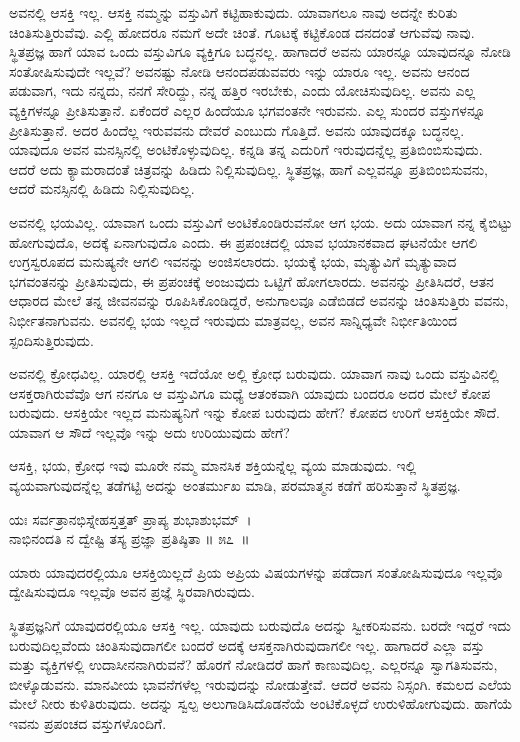 ಅವನಲ್ಲಿ ಆಸಕ್ತಿ ಇಲ್ಲ. ಆಸಕ್ತಿ ನಮ್ಮನ್ನು ವಸ್ತುವಿಗೆ ಕಟ್ಟಿಹಾಕುವುದು. ಯಾವಾಗಲೂ ನಾವು ಅದನ್ನೇ ಕುರಿತು ಚಿಂತಿಸುತ್ತಿರುವೆವು. ಎಲ್ಲಿ ಹೋದರೂ ನಮಗೆ ಅದೇ ಚಿಂತೆ. ಗೂಟಕ್ಕೆ ಕಟ್ಟಿಕೊಂಡ ದನದಂತೆ ಆಗುವೆವು ನಾವು. ಸ್ಥಿತಪ್ರಜ್ಞ ಹಾಗೆ ಯಾವ ಒಂದು ವಸ್ತುವಿಗೂ ವ್ಯಕ್ತಿಗೂ ಬದ್ಧನಲ್ಲ. ಹಾಗಾದರೆ ಅವನು ಯಾರನ್ನೂ ಯಾವುದನ್ನೂ ನೋಡಿ ಸಂತೋಷಿಸುವುದೇ ಇಲ್ಲವೆ? ಅವನಷ್ಟು ನೋಡಿ ಆನಂದಪಡುವವರು ಇನ್ನು ಯಾರೂ ಇಲ್ಲ. ಅವನು ಆನಂದ ಪಡುವಾಗ, ಇದು ನನ್ನದು, ನನಗೆ ಸೇರಿದ್ದು, ನನ್ನ ಹತ್ತಿರ ಇರಬೇಕು, ಎಂದು ಯೋಚಿಸುವುದಿಲ್ಲ. ಅವನು ಎಲ್ಲ ವ್ಯಕ್ತಿಗಳನ್ನೂ ಪ್ರೀತಿಸುತ್ತಾನೆ. ಏಕೆಂದರೆ ಎಲ್ಲರ ಹಿಂದೆಯೂ ಭಗವಂತನೇ ಇರುವನು. ಎಲ್ಲ ಸುಂದರ ವಸ್ತುಗಳನ್ನೂ ಪ್ರೀತಿಸುತ್ತಾನೆ. ಅದರ ಹಿಂದೆಲ್ಲ ಇರುವವನು ದೇವರೆ ಎಂಬುದು ಗೊತ್ತಿದೆ. ಅವನು ಯಾವುದಕ್ಕೂ ಬದ್ಧನಲ್ಲ. ಯಾವುದೂ ಅವನ ಮನಸ್ಸಿನಲ್ಲಿ ಅಂಟಿಕೊಳ್ಳುವುದಿಲ್ಲ. ಕನ್ನಡಿ ತನ್ನ ಎದುರಿಗೆ ಇರುವುದನ್ನೆಲ್ಲ ಪ್ರತಿಬಿಂಬಿಸುವುದು. ಆದರೆ ಅದು ಕ್ಯಾಮರಾದಂತೆ ಚಿತ್ರವನ್ನು ಹಿಡಿದು ನಿಲ್ಲಿಸುವುದಿಲ್ಲ. ಸ್ಥಿತಪ್ರಜ್ಞ, ಹಾಗೆ ಎಲ್ಲವನ್ನೂ ಪ್ರತಿಬಿಂಬಿಸುವನು, ಆದರೆ ಮನಸ್ಸಿನಲ್ಲಿ ಹಿಡಿದು ನಿಲ್ಲಿಸುವುದಿಲ್ಲ.

ಅವನಲ್ಲಿ ಭಯವಿಲ್ಲ. ಯಾವಾಗ ಒಂದು ವಸ್ತುವಿಗೆ ಅಂಟಿಕೊಂಡಿರುವನೋ ಆಗ ಭಯ. ಅದು ಯಾವಾಗ ನನ್ನ ಕೈಬಿಟ್ಟು ಹೋಗುವುದೊ, ಅದಕ್ಕೆ ಏನಾಗುವುದೊ ಎಂದು. ಈ ಪ್ರಪಂಚದಲ್ಲಿ ಯಾವ ಭಯಾನಕವಾದ ಘಟನೆಯೇ ಆಗಲಿ ಉಗ್ರಸ್ವರೂಪದ ಮನುಷ್ಯನೇ ಆಗಲಿ ಇವನನ್ನು ಅಂಜಿಸಲಾರದು. ಭಯಕ್ಕೆ ಭಯ, ಮೃತ್ಯುವಿಗೆ ಮೃತ್ಯುವಾದ ಭಗವಂತನನ್ನು ಪ್ರೀತಿಸುವುದು, ಈ ಪ್ರಪಂಚಕ್ಕೆ ಅಂಜುವುದು ಒಟ್ಟಿಗೆ ಹೋಗಲಾರದು. ಅವನನ್ನು ಪ್ರೀತಿಸಿದರೆ, ಆತನ ಆಧಾರದ ಮೇಲೆ ತನ್ನ ಜೀವನವನ್ನು ರೂಪಿಸಿಕೊಂಡಿದ್ದರೆ, ಅನುಗಾಲವೂ ಎಡೆಬಿಡದೆ ಅವನನ್ನು ಚಿಂತಿಸುತ್ತಿರು ವವನು, ನಿರ್ಭೀತನಾಗುವನು. ಅವನಲ್ಲಿ ಭಯ ಇಲ್ಲದೆ ಇರುವುದು ಮಾತ್ರವಲ್ಲ, ಅವನ ಸಾನ್ನಿಧ್ಯವೇ ನಿರ್ಭೀತಿಯಿಂದ ಸ್ಪಂದಿಸುತ್ತಿರುವುದು.

ಅವನಲ್ಲಿ ಕ್ರೋಧವಿಲ್ಲ. ಯಾರಲ್ಲಿ ಆಸಕ್ತಿ ಇದೆಯೋ ಅಲ್ಲಿ ಕ್ರೋಧ ಬರುವುದು. ಯಾವಾಗ ನಾವು ಒಂದು ವಸ್ತುವಿನಲ್ಲಿ ಆಸಕ್ತರಾಗಿರುವೆವೊ ಆಗ ನನಗೂ ಆ ವಸ್ತುವಿಗೂ ಮಧ್ಯೆ ಆತಂಕವಾಗಿ ಯಾವುದು ಬಂದರೂ ಅದರ ಮೇಲೆ ಕೋಪ ಬರುವುದು. ಆಸಕ್ತಿಯೇ ಇಲ್ಲದ ಮನುಷ್ಯನಿಗೆ ಇನ್ನು ಕೋಪ ಬರುವುದು ಹೇಗೆ? ಕೋಪದ ಉರಿಗೆ ಆಸಕ್ತಿಯೇ ಸೌದೆ. ಯಾವಾಗ ಆ ಸೌದೆ ಇಲ್ಲವೊ ಇನ್ನು ಅದು ಉರಿಯುವುದು ಹೇಗೆ?

ಆಸಕ್ತಿ, ಭಯ, ಕ್ರೋಧ ಇವು ಮೂರೇ ನಮ್ಮ ಮಾನಸಿಕ ಶಕ್ತಿಯನ್ನೆಲ್ಲ ವ್ಯಯ ಮಾಡುವುದು. ಇಲ್ಲಿ ವ್ಯಯವಾಗುವುದನ್ನೆಲ್ಲ ತಡೆಗಟ್ಟಿ ಅದನ್ನು ಅಂತರ್ಮುಖ ಮಾಡಿ, ಪರಮಾತ್ಮನ ಕಡೆಗೆ ಹರಿಸುತ್ತಾನೆ ಸ್ಥಿತಪ್ರಜ್ಞ.

\begin{shloka}
ಯಃ ಸರ್ವತ್ರಾನಭಿಸ್ನೇಹಸ್ತತ್ತತ್ ಪ್ರಾಪ್ಯ ಶುಭಾಶುಭಮ್~।\\ನಾಭಿನಂದತಿ ನ ದ್ವೇಷ್ಟಿ ತಸ್ಯ ಪ್ರಜ್ಞಾ ಪ್ರತಿಷ್ಠಿತಾ \hfill॥ ೫೭~॥
\end{shloka}

\begin{artha}
ಯಾರು ಯಾವುದರಲ್ಲಿಯೂ ಆಸಕ್ತಿಯಿಲ್ಲದೆ ಪ್ರಿಯ ಅಪ್ರಿಯ ವಿಷಯಗಳನ್ನು ಪಡೆದಾಗ ಸಂತೋಷಿ\-ಸುವುದೂ ಇಲ್ಲವೊ ದ್ವೇಷಿಸುವುದೂ ಇಲ್ಲವೊ ಅವನ ಪ್ರಜ್ಞೆ ಸ್ಥಿರವಾಗಿರುವುದು.
\end{artha}

ಸ್ಥಿತಪ್ರಜ್ಞನಿಗೆ ಯಾವುದರಲ್ಲಿಯೂ ಆಸಕ್ತಿ ಇಲ್ಲ. ಯಾವುದು ಬರುವುದೊ ಅದನ್ನು ಸ್ವೀಕರಿಸು\-ವನು. ಬರದೇ ಇದ್ದರೆ ಇದು ಬರುವುದಿಲ್ಲವೆಂದು ಚಿಂತಿಸುವುದಾಗಲೀ ಬಂದರೆ ಅದಕ್ಕೆ ಆಸಕ್ತ\-ನಾಗಿರುವುದಾಗಲೀ ಇಲ್ಲ. ಹಾಗಾದರೆ ಎಲ್ಲಾ ವಸ್ತು ಮತ್ತು ವ್ಯಕ್ತಿಗಳಲ್ಲಿ ಉದಾಸೀನನಾಗಿರುವನೆ? ಹೊರಗೆ ನೋಡಿದರೆ ಹಾಗೆ ಕಾಣುವುದಿಲ್ಲ. ಎಲ್ಲರನ್ನೂ ಸ್ವಾಗತಿಸುವನು, ಬೀಳ್ಕೊಡುವನು. ಮಾನವೀಯ ಭಾವನೆಗಳೆಲ್ಲ ಇರುವುದನ್ನು ನೋಡುತ್ತೇವೆ. ಆದರೆ ಅವನು ನಿಸ್ಸಂಗಿ. ಕಮಲದ ಎಲೆಯ ಮೇಲೆ ನೀರು ಕುಳಿತಿರುವುದು. ಅದನ್ನು ಸ್ವಲ್ಪ ಅಲುಗಾಡಿಸಿದೊಡನೆಯೆ ಅಂಟಿಕೊಳ್ಳದೆ ಉರುಳಿಹೋಗುವುದು. ಹಾಗೆಯೆ ಇವನು ಪ್ರಪಂಚದ ವಸ್ತುಗಳೊಂದಿಗೆ.

